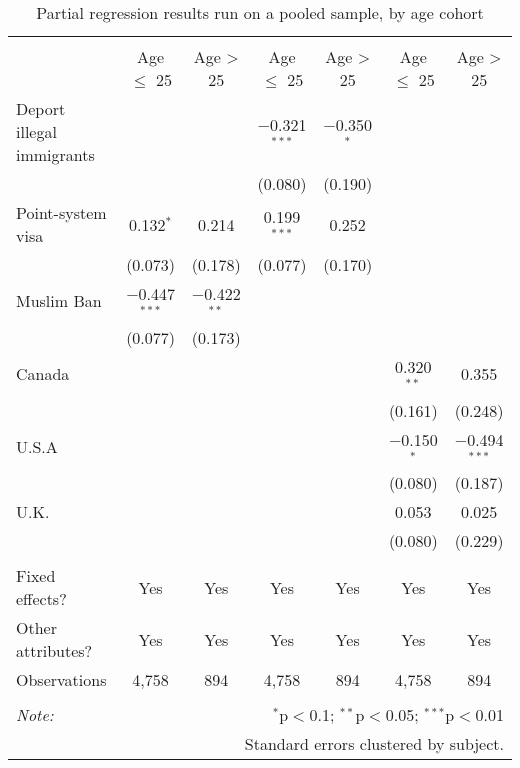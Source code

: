
\begin{table}[!htbp] \centering 
  \caption{Partial regression results run on a pooled sample, by age cohort} 
  \label{tab:imm_age} 
\footnotesize 
\begin{tabular}{@{\extracolsep{5pt}}lcccccc} 
\\[-1.8ex]\hline 
\hline \\[-1.8ex] 
 & Age $\leq$ 25 & Age > 25 & Age $\leq$ 25 & Age > 25 & Age $\leq$ 25 & Age > 25 \\ 
 Deport illegal immigrants &  &  & $-$0.321$^{***}$ & $-$0.350$^{*}$ &  &  \\ 
  &  &  & (0.080) & (0.190) &  &  \\ 
  Point-system visa & 0.132$^{*}$ & 0.214 & 0.199$^{***}$ & 0.252 &  &  \\ 
  & (0.073) & (0.178) & (0.077) & (0.170) &  &  \\ 
  Muslim Ban & $-$0.447$^{***}$ & $-$0.422$^{**}$ &  &  &  &  \\ 
  & (0.077) & (0.173) &  &  &  &  \\ 
  Canada &  &  &  &  & 0.320$^{**}$ & 0.355 \\ 
  &  &  &  &  & (0.161) & (0.248) \\ 
  U.S.A &  &  &  &  & $-$0.150$^{*}$ & $-$0.494$^{***}$ \\ 
  &  &  &  &  & (0.080) & (0.187) \\ 
  U.K. &  &  &  &  & 0.053 & 0.025 \\ 
  &  &  &  &  & (0.080) & (0.229) \\ 
 \hline \\[-1.8ex] 
Fixed effects? & Yes & Yes & Yes & Yes & Yes & Yes \\ 
Other attributes? & Yes & Yes & Yes & Yes & Yes & Yes \\ 
Observations & 4,758 & 894 & 4,758 & 894 & 4,758 & 894 \\ 
\hline 
\hline \\[-1.8ex] 
\textit{Note:}  & \multicolumn{6}{r}{$^{*}$p$<$0.1; $^{**}$p$<$0.05; $^{***}$p$<$0.01} \\ 
 & \multicolumn{6}{r}{Standard errors clustered by subject.} \\ 
\end{tabular} 
\end{table} 

